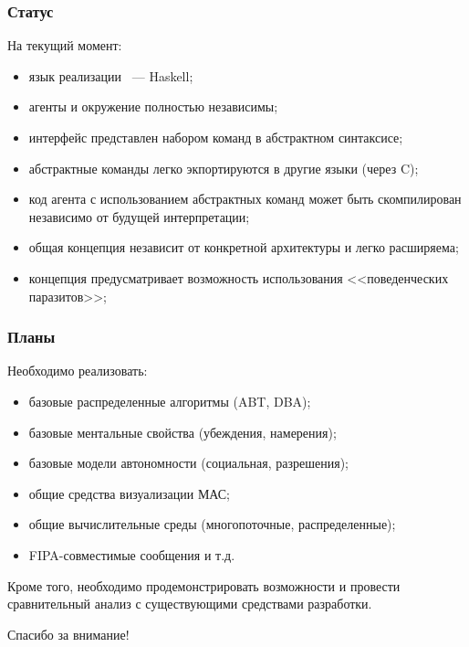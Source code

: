 \documentclass{beamer}
\begin{document}
\begin{frame}
  \frametitle{Статус}
  На текущий момент:
  \begin{itemize}
    \item язык реализации ~--- Haskell;
    \item агенты и окружение полностью независимы;
    \item интерфейс представлен набором команд в абстрактном синтаксисе;
    \item абстрактные команды легко экпортируются в другие языки (через C);
    \item код агента с использованием абстрактных команд может быть скомпилирован
      независимо от будущей интерпретации;
    \item общая концепция независит от конкретной архитектуры и легко расширяема;
    \item концепция предусматривает возможность использования <<поведенческих паразитов>>;
  \end{itemize}
\end{frame}

\begin{frame}
  \frametitle{Планы}
  Необходимо реализовать:
  \begin{itemize}
    \item базовые распределенные алгоритмы (ABT, DBA);
    \item базовые ментальные свойства (убеждения, намерения);
    \item базовые модели автономности (социальная, разрешения);
    \item общие средства визуализации МАС;
    \item общие вычислительные среды (многопоточные, распределенные);
    \item FIPA-совместимые сообщения и т.д.
  \end{itemize}

  Кроме того, необходимо продемонстрировать возможности и провести сравнительный анализ
  с существующими средствами разработки.
\end{frame}

\begin{frame}{}
\addtocounter{framenumber}{-1}
\begin{center}
\LARGE{Спасибо за внимание!}
\end{center}
\end{frame}
\end{document}
